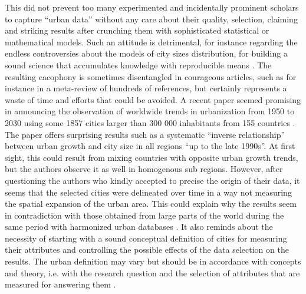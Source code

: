 \documentclass[10pt,letterpaper]{article}
\begin{document}
This did not prevent too many experimented and incidentally prominent scholars to capture “urban data” without any care about their quality, selection, claiming and striking results after crunching them with sophisticated statistical or mathematical models. Such an attitude is detrimental, for instance regarding the endless controversies about the models of city sizes distribution, for building a sound science that accumulates knowledge with reproducible means \citep{pumain2012theorie}. The resulting cacophony is sometimes disentangled in courageous articles, such as for instance \citep{cottineau2017metazipf,cottineau2020metametazipf} in a meta-review of hundreds of references, but certainly represents a waste of time and efforts that could be avoided. A recent paper seemed promising in announcing the observation of worldwide trends in urbanization from 1950 to 2030 using some 1857 cities larger than 300 000 inhabitants from 155 countries \citep{egidi2020long}. The paper offers surprising results such as a systematic ``inverse relationship'' between urban growth and city size in all regions ``up to the late 1990s''. At first sight, this could result from mixing countries with opposite urban growth trends, but the authors observe it as well in homogenous sub regions. However, after questioning the authors who kindly accepted to precise the origin of their data, it seems that the selected cities were delineated over time in a way not measuring the spatial expansion of the urban area. This could explain why the results seem in contradiction with those obtained from large parts of the world during the same period with harmonized urban databases \citep{cura2017old}. It also reminds about the necessity of starting with a sound conceptual definition of cities for measuring their attributes and controlling the possible effects of the data selection on the results. The urban definition may vary but should be in accordance with concepts and theory, i.e. with the research question and the selection of attributes that are measured for answering them \citep{rozenblat2020extending}.
\end{document}
